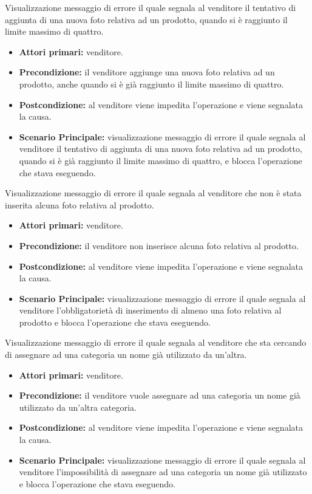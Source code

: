 Visualizzazione messaggio di errore il quale segnala al venditore il tentativo di aggiunta di una nuova foto relativa ad un prodotto, quando si è raggiunto il limite massimo di quattro.
\begin{itemize}
    \item \textbf{Attori primari:} venditore.
    \item \textbf{Precondizione:} il venditore aggiunge una nuova foto relativa ad un prodotto, anche quando si è già raggiunto il limite massimo di quattro.
    \item \textbf{Postcondizione:} al venditore viene impedita l'operazione e viene segnalata la causa.
    \item \textbf{Scenario Principale:} visualizzazione messaggio di errore il quale segnala al venditore il tentativo di aggiunta di una nuova foto relativa ad un prodotto, quando si è già raggiunto il limite massimo di quattro, e blocca l'operazione che stava eseguendo.
\end{itemize}

Visualizzazione messaggio di errore il quale segnala al venditore che non è stata inserita alcuna foto relativa al prodotto.
\begin{itemize}
    \item \textbf{Attori primari:} venditore.
    \item \textbf{Precondizione:} il venditore non inserisce alcuna foto relativa al prodotto.
    \item \textbf{Postcondizione:} al venditore viene impedita l'operazione e viene segnalata la causa.
    \item \textbf{Scenario Principale:} visualizzazione messaggio di errore il quale segnala al venditore l'obbligatorietà di inserimento di almeno una foto relativa al prodotto e blocca l'operazione che stava eseguendo.
\end{itemize}

Visualizzazione messaggio di errore il quale segnala al venditore che sta cercando di assegnare ad una categoria un nome già utilizzato da un'altra.
\begin{itemize}
    \item \textbf{Attori primari:} venditore.
    \item \textbf{Precondizione:} il venditore vuole assegnare ad una categoria un nome già utilizzato da un'altra categoria.
    \item \textbf{Postcondizione:} al venditore viene impedita l'operazione e viene segnalata la causa.
    \item \textbf{Scenario Principale:} visualizzazione messaggio di errore il quale segnala al venditore l'impossibilità di assegnare ad una categoria un nome già utilizzato e blocca l'operazione che stava eseguendo.
\end{itemize}

